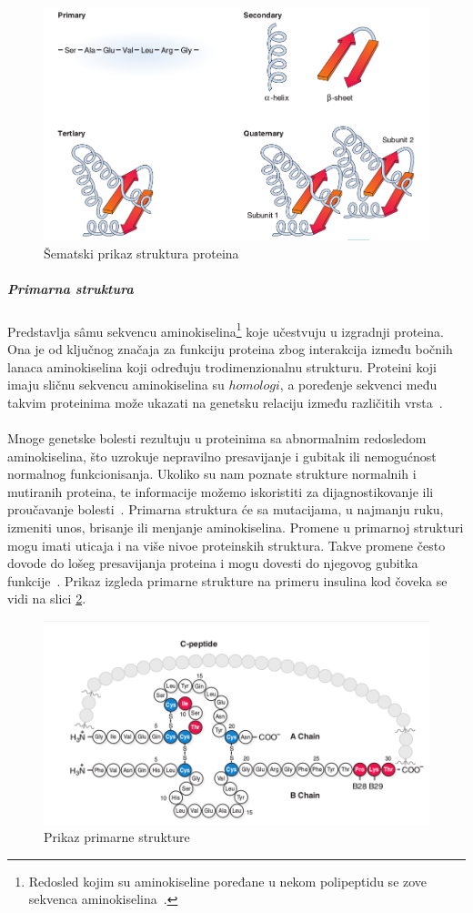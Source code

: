 \begin{figure}[h]
	\centering
    \includegraphics[width=1\textwidth]{Figures/BO/structure_schema.png}
    \caption{Šematski prikaz struktura proteina~\cite{bmbg}}
    \label{fig:structures2}
\end{figure}
\subparagraph{Primarna struktura}
Predstavlja s\^amu sekvencu aminokiselina\footnote{Redosled kojim su aminokiseline poređane u nekom polipeptidu se zove sekvenca aminokiselina~\cite{spasic}.} koje učestvuju u izgradnji proteina. Ona je od ključnog značaja za funkciju proteina zbog interakcija između bočnih lanaca aminokiselina koji određuju trodimenzionalnu strukturu. Proteini koji imaju sličnu sekvencu aminokiselina su $homologi$, a poređenje sekvenci među takvim proteinima može ukazati na genetsku relaciju između različitih vrsta~\cite{spasic}.\\\\
Mnoge genetske bolesti rezultuju u proteinima sa abnormalnim redosledom aminokiselina, što uzrokuje nepravilno presavijanje i gubitak ili nemogućnost normalnog funkcionisanja. Ukoliko su nam poznate strukture normalnih i mutiranih proteina, te informacije možemo iskoristiti za dijagnostikovanje ili proučavanje bolesti~\cite{lippincott}. Primarna struktura će sa mutacijama, u najmanju ruku, izmeniti unos, brisanje ili menjanje aminokiselina. Promene u primarnoj strukturi mogu imati uticaja i na više nivoe proteinskih struktura. Takve promene često dovode do lošeg presavijanja proteina i mogu dovesti do njegovog gubitka funkcije~\cite{flash}.
Prikaz izgleda primarne strukture na primeru insulina kod čoveka se vidi na slici \ref{fig:insulin}.
\begin{figure}[h]
	\centering
    \includegraphics[width=1\textwidth]{Figures/BO/insulin.png}
    \caption{Prikaz primarne strukture~\cite{bmbg}}
    \label{fig:insulin}
\end{figure}

